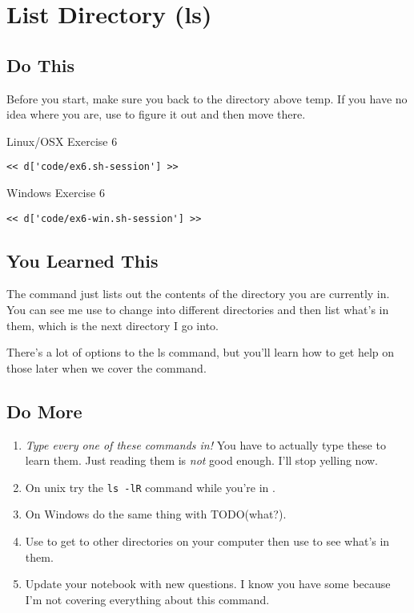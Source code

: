 \chapter{List Directory (ls)}

\section{Do This}

Before you start, make sure you  back to the directory above temp.
If you have no idea where you are, use  to figure it out and then
move there.

\begin{code}{Linux/OSX Exercise 6}
\begin{Verbatim}
<< d['code/ex6.sh-session'] >>
\end{Verbatim}
\end{code}

\begin{code}{Windows Exercise 6}
\begin{Verbatim}
<< d['code/ex6-win.sh-session'] >>
\end{Verbatim}
\end{code}

\section{You Learned This}

The  command just lists out the contents of the directory you
are currently in.  You can see me use  to change into different
directories and then list what's in them, which is the next directory I
go into.

There's a lot of options to the ls command, but you'll learn how to get
help on those later when we cover the  command.

\section{Do More}

\begin{enumerate}
\item \emph{Type every one of these commands in!} You have to actually type these
    to learn them.  Just reading them is \emph{not} good enough.  I'll stop yelling
    now.
\item On unix try the \verb|ls -lR| command while you're in .
\item On Windows do the same thing with TODO(what?).
\item Use  to get to other directories on your computer then use  to see what's in them.
\item Update your notebook with new questions.  I know you have some because I'm
    not covering everything about this command.
\end{enumerate}

